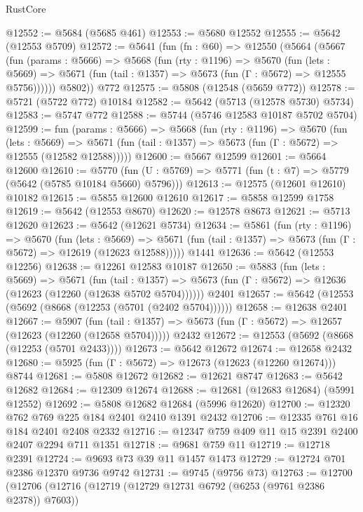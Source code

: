 \begin{lexlean}{RustCore}
\begin{coremodule}
@12552 := @5684 (@5685 @461)
@12553 := @5680 @12552
@12555 := @5642 (@12553 @5709)
@12572 := @5641
    (fun (fn : @60) =>
    @12550
      (@5664
        (@5667
          (fun (params : @5666) =>
          @5668
            (fun (rty : @1196) =>
            @5670
              (fun (lets : @5669) =>
              @5671 (fun (tail : @1357) => @5673 (fun (Γ : @5672) => @12555 @5756))))))
        @5802))
    @772
@12575 := @5808 (@12548 (@5659 @772))
@12578 := @5721 (@5722 @772) @10184
@12582 := @5642 (@5713 (@12578 @5730) @5734)
@12583 := @5747 @772
@12588 := @5744 (@5746 @12583 @10187 @5702 @5704)
@12599 := fun (params : @5666) =>
  @5668
    (fun (rty : @1196) =>
    @5670
      (fun (lets : @5669) =>
      @5671 (fun (tail : @1357) => @5673 (fun (Γ : @5672) => @12555 (@12582 @12588)))))
@12600 := @5667 @12599
@12601 := @5664 @12600
@12610 := @5770
    (fun (U : @5769) => @5771 (fun (t : @7) => @5779 (@5642 (@5785 @10184 @5660) @5796)))
@12613 := @12575 (@12601 @12610) @10182
@12615 := @5855 @12600 @12610
@12617 := @5858 @12599 @1758
@12619 := @5642 (@12553 @8670)
@12620 := @12578 @8673
@12621 := @5713 @12620
@12623 := @5642 (@12621 @5734)
@12634 := @5861
    (fun (rty : @1196) =>
    @5670
      (fun (lets : @5669) =>
      @5671 (fun (tail : @1357) => @5673 (fun (Γ : @5672) => @12619 (@12623 @12588)))))
    @1441
@12636 := @5642 (@12553 @12256)
@12638 := @12261 @12583 @10187
@12650 := @5883
    (fun (lets : @5669) =>
    @5671
      (fun (tail : @1357) =>
      @5673 (fun (Γ : @5672) => @12636 (@12623 (@12260 (@12638 @5702 @5704))))))
    @2401
@12657 := @5642 (@12553 (@5692 (@8668 (@12253 (@5701 (@2402 @5704))))))
@12658 := @12638 @2401
@12667 := @5907
    (fun (tail : @1357) => @5673 (fun (Γ : @5672) => @12657 (@12623 (@12260 (@12658 @5704)))))
    @2432
@12672 := @12553 (@5692 (@8668 (@12253 (@5701 @2433))))
@12673 := @5642 @12672
@12674 := @12658 @2432
@12680 := @5925 (fun (Γ : @5672) => @12673 (@12623 (@12260 @12674))) @8744
@12681 := @5808 @12672
@12682 := @12621 @8747
@12683 := @5642 @12682
@12684 := @12309 @12674
@12688 := @12681 (@12683 @12684) (@5991 @12552)
@12692 := @5808 @12682 @12684 (@5996 @12620)
@12700 := @12320 @762 @769 @225 @184 @2401 @2410 @1391 @2432
@12706 := @12335 @761 @16 @184 @2401 @2408 @2332
@12716 := @12347 @759 @409 @11 @15 @2391 @2400 @2407 @2294 @711 @1351
@12718 := @9681 @759 @11
@12719 := @12718 @2391
@12724 := @9693 @73 @39 @11 @1457 @1473
@12729 := @12724 @701 @2386 @12370 @9736 @9742
@12731 := @9745 (@9756 @73)
@12763 := @12700
    (@12706
      (@12716
        (@12719 (@12729 @12731 @6792 (@6253 (@9761 @2386 @2378)) @7603))

\end{coremodule}
\end{lexlean}
